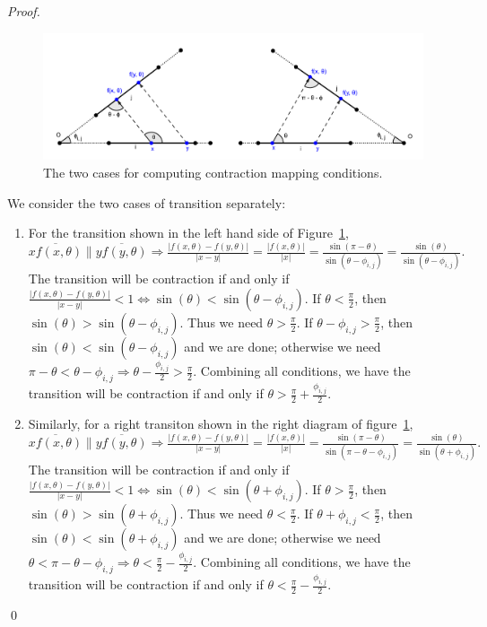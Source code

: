 \documentclass[]{styles/svproc}  %
\begin{document}
\begin{appendix}
\begin{proof}

\begin{figure}
    \includegraphics[width=1\linewidth]{figures/contraction_map_cond.png}
    \centering
    \caption{The two cases for computing contraction mapping conditions. \label{fig:cont_map}}
    \centering
\end{figure}

We consider the two cases of transition separately:
\begin{enumerate}
    \item For the transition shown in the left hand side of Figure~\ref{fig:cont_map}, 
          $\overline{xf(x, \theta)} \parallel \overline{yf(y, \theta)} \Rightarrow \frac{|f(x, \theta)-f(y, \theta)|}{|x-y|} = \frac{|f(x, \theta)|}{|x|} = \frac{\sin(\pi - \theta)}{\sin(\theta - \phi_{i, j})} = \frac{\sin(\theta)}{\sin(\theta-\phi_{i, j})}.$ The transition will be contraction if and only if $\frac{|f(x, \theta)-f(y, \theta)|}{|x-y|} < 1 \iff \sin(\theta)<\sin(\theta-\phi_{i, j})$. If $\theta < \frac{\pi}{2}$, then $\sin(\theta) > \sin(\theta-\phi_{i, j})$. Thus we need $\theta>\frac{\pi}{2}$. If $\theta-\phi_{i, j} > \frac{\pi}{2}$, then $\sin(\theta) < \sin(\theta-\phi_{i, j})$ and we are done; otherwise we need $\pi - \theta < \theta-\phi_{i, j} \Rightarrow \theta - \frac{\phi_{i, j}}{2} > \frac{\pi}{2}$. Combining all conditions, we have the transition will be contraction if and only if $\theta >\frac{\pi}{2} + \frac{\phi_{i, j}}{2}$.
    \item Similarly, for a right transiton shown in the right diagram of figure~\ref{fig:cont_map}, $\overline{xf(x, \theta)} \parallel \overline{yf(y, \theta)} \Rightarrow \frac{|f(x, \theta)-f(y, \theta)|}{|x-y|} = \frac{|f(x, \theta)|}{|x|} = \frac{\sin(\pi - \theta)}{\sin(\pi -\theta-\phi_{i, j})} = \frac{\sin(\theta)}{\sin(\theta + \phi_{i, j})}.$ The transition will be contraction if and only if $\frac{|f(x, \theta)-f(y, \theta)|}{|x-y|} < 1 \iff \sin(\theta)<\sin(\theta+\phi_{i, j})$. If $\theta  > \frac{\pi}{2}$, then $\sin(\theta) > \sin(\theta + \phi_{i, j})$. Thus we need $\theta<\frac{\pi}{2}$. If $\theta+\phi_{i, j} < \frac{\pi}{2}$, then $\sin(\theta) < \sin(\theta+\phi_{i, j})$ and we are done; otherwise we need $\theta < \pi-\theta-\phi_{i, j} \Rightarrow \theta < \frac{\pi}{2} - \frac{\phi_{i, j}}{2}$. Combining all conditions, we have the transition will be contraction if and only if $\theta <\frac{\pi}{2} - \frac{\phi_{i, j}}{2}$.
\end{enumerate}
\qed


\end{proof}
\end{appendix}
\end{document}
